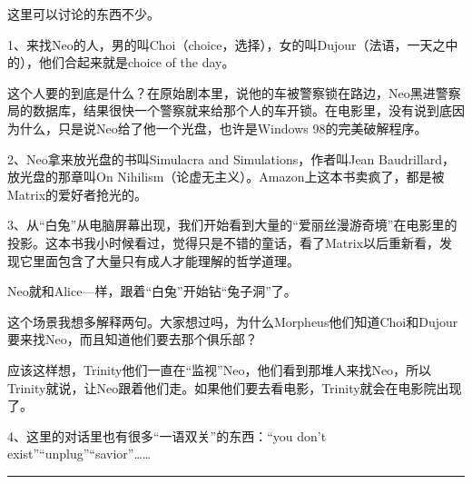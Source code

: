 \documentclass{ctexart}
\newcommand{\myparsep}{\noindent \rule[0.5ex]{\linewidth}{1pt}}
\begin{document}
这里可以讨论的东西不少。

1、来找Neo的人，男的叫Choi（choice，选择），女的叫Dujour（法语，一天之中的），他们合起来就是choice of the day。

这个人要的到底是什么？在原始剧本里，说他的车被警察锁在路边，Neo黑进警察局的数据库，结果很快一个警察就来给那个人的车开锁。在电影里，没有说到底因为什么，只是说Neo给了他一个光盘，也许是Windows 98的完美破解程序。

2、Neo拿来放光盘的书叫Simulacra and Simulations，作者叫Jean Baudrillard，放光盘的那章叫On Nihilism（论虚无主义）。Amazon上这本书卖疯了，都是被Matrix的爱好者抢光的。

3、从“白兔”从电脑屏幕出现，我们开始看到大量的“爱丽丝漫游奇境”在电影里的投影。这本书我小时候看过，觉得只是不错的童话，看了Matrix以后重新看，发现它里面包含了大量只有成人才能理解的哲学道理。

Neo就和Alice—样，跟着“白兔”开始钻“兔子洞”了。

这个场景我想多解释两句。大家想过吗，为什么Morpheus他们知道Choi和Dujour要来找Neo，而且知道他们要去那个俱乐部？

应该这样想，Trinity他们一直在“监视”Neo，他们看到那堆人来找Neo，所以Trinity就说，让Neo跟着他们走。如果他们要去看电影，Trinity就会在电影院出现了。

4、这里的对话里也有很多“一语双关”的东西：“you don't exist”“unplug”“savior”……

\myparsep
\end{document}
